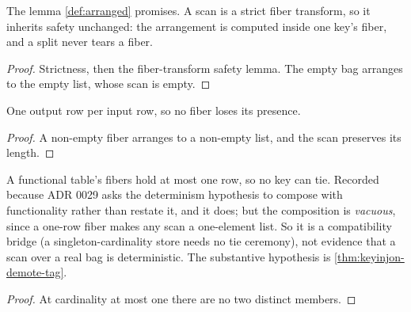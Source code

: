 \begin{theorem}
  \label{thm:scanfiber-splitsafe}\leanok
  The lemma \ref{def:arranged} promises.  A scan is a strict fiber
  transform, so it inherits safety unchanged: the arrangement is computed
  inside one key's fiber, and a split never tears a fiber.
\end{theorem}
\begin{proof}\leanok
  Strictness, then the fiber-transform safety lemma.  The empty bag
  arranges to the empty list, whose scan is empty.
\end{proof}

\begin{theorem}
  \label{thm:scanfiber-exhaustive}\leanok
  One output row per input row, so no fiber loses its presence.
\end{theorem}
\begin{proof}\leanok
  A non-empty fiber arranges to a non-empty list, and the scan preserves
  its length.
\end{proof}

\begin{theorem}
  \label{thm:keyinjon-of-functional}\leanok
  A functional table's fibers hold at most one row, so no key can tie.
  Recorded because ADR 0029 asks the determinism hypothesis to compose with
  functionality rather than restate it, and it does; but the composition is
  \emph{vacuous}, since a one-row fiber makes any scan a one-element list.
  So it is a compatibility bridge (a singleton-cardinality store needs no
  tie ceremony), not evidence that a scan over a real bag is deterministic.
  The substantive hypothesis is \ref{thm:keyinjon-demote-tag}.
\end{theorem}
\begin{proof}\leanok
  At cardinality at most one there are no two distinct members.
\end{proof}

